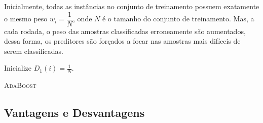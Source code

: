 Inicialmente, todas as instâncias no conjunto de treinamento possuem exatamente o mesmo peso $w_i = \dfrac{1}{N}$, onde $N$ é o tamanho do conjunto de treinamento. Mas, a cada rodada, o peso das amostras classificadas erroneamente são aumentados, dessa forma, os preditores são forçados a focar nas amostras mais difíceis de serem classificadas.


%
 \begin{algorithm}[H]
   \SetAlgoLined
   
   Inicialize $D_1(i) = \frac{1}{N}$.   
   
   
   \label{alg1}
   \caption{\textsc{AdaBoost}}
 \end{algorithm}
%


\subsection{Vantagens e Desvantagens}